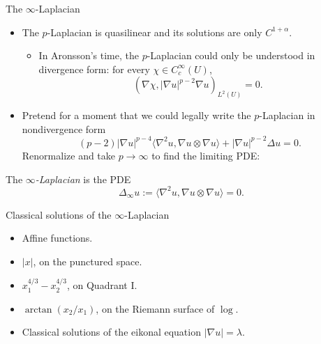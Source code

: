 \documentclass[10pt]{beamer}
\begin{document}
\begin{frame}{The $\infty$-Laplacian}
\begin{itemize}
\item The $p$-Laplacian is quasilinear and its solutions are only $C^{1 + \alpha}$.
\begin{itemize}
\item In Aronsson's time, the $p$-Laplacian could only be understood in divergence form: for every $\chi \in C^\infty_c(U)$,
$$(\nabla \chi, |\nabla u|^{p - 2} \nabla u)_{L^2(U)} = 0.$$
\end{itemize}
\item Pretend for a moment that we could legally write the $p$-Laplacian in nondivergence form 
$$(p - 2) |\nabla u|^{p - 4} \langle \nabla^2 u, \nabla u \otimes \nabla u\rangle + |\nabla u|^{p - 2} \Delta u = 0.$$
Renormalize and take $p \to \infty$ to find the limiting PDE: 
\end{itemize} 

\begin{definition}
The \emph{$\infty$-Laplacian} is the PDE 
$$\Delta_\infty u := \langle \nabla^2 u, \nabla u \otimes \nabla u\rangle = 0.$$
\end{definition}
\end{frame}

\begin{frame}{Classical solutions of the $\infty$-Laplacian}
\begin{itemize}
\item Affine functions.
\item $|x|$, on the punctured space.
\item $x_1^{4/3} - x_2^{4/3}$, on Quadrant I.
\item $\arctan(x_2/x_1)$, on the Riemann surface of $\log$.
\item Classical solutions of the eikonal equation $|\nabla u| = \lambda$.
\end{itemize}
\end{frame}
\end{document}
